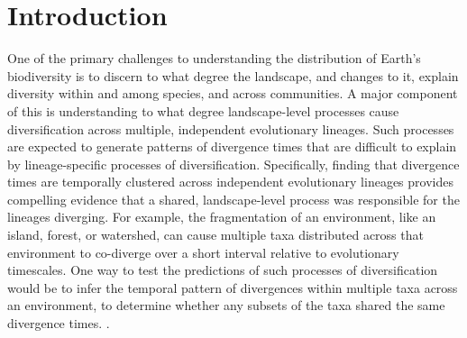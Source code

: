 \section{Introduction}

One of the primary challenges to understanding the distribution of Earth's
biodiversity is to discern to what degree the landscape, and changes to it,
explain diversity within and among species, and across communities.
A major component of this is understanding to what degree landscape-level
processes cause diversification across multiple, independent evolutionary
lineages.
Such processes are expected to generate patterns of divergence times that are
difficult to explain by lineage-specific processes of diversification.
Specifically, finding that divergence times are temporally clustered across
independent evolutionary lineages provides compelling evidence that a shared,
landscape-level process was responsible for the lineages diverging.
For example, the fragmentation of an environment, like an island, forest, or
watershed, can cause multiple taxa distributed across that environment to
co-diverge over a short interval relative to evolutionary timescales.
One way to test the predictions of such processes of diversification would be
to infer the temporal pattern of divergences within multiple taxa across an
environment, to determine whether any subsets of the taxa shared the same
divergence times.
.

